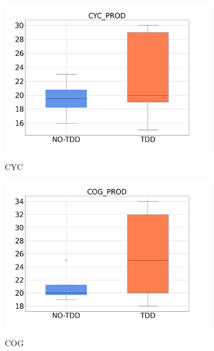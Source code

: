 \begin{figure}[H]
    \medskip
    \begin{subfigure}{0.33\textwidth}
        \includegraphics[width=\linewidth]{figures/box_plots/task3/CYC.png}
        \caption{CYC}
        \label{bp_task3_cyc}
    \end{subfigure}\hfil
    \begin{subfigure}{0.33\textwidth}
        \includegraphics[width=\linewidth]{figures/box_plots/task3/COG.png}
        \caption{COG}
        \label{bp_task3_cog}
    \end{subfigure}\hfil
    \begin{subfigure}{0.33\textwidth}

\end{subfigure}
\end{figure}
